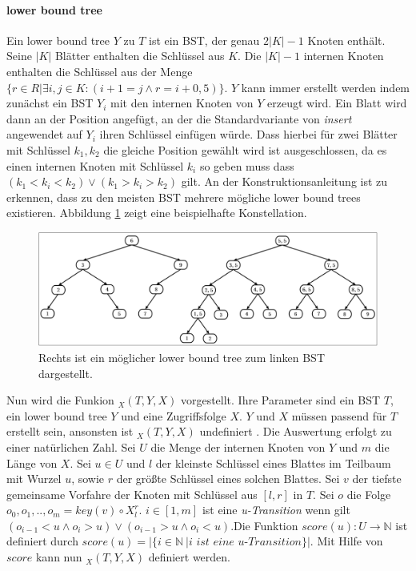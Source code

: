 \documentclass[a4paper,12pt]{article}
\begin{document}
\paragraph{lower bound tree} \label{wilberLowerBoundTree}
Ein lower bound tree $Y$ zu $T$ ist ein BST, der genau $2 \vert K\vert  - 1$ Knoten enthält. Seine $\vert K \vert$ Blätter enthalten die Schlüssel aus $K$. Die $\vert K \vert - 1$ internen Knoten enthalten die Schlüssel aus der Menge $\{r \in R \vert \exists i,j \in K \colon \left( i + 1 = j \land r = i + 0,5\right)\}$. $Y$ kann immer erstellt werden indem zunächst ein BST $Y_i$ mit den internen Knoten von $Y$ erzeugt wird. Ein Blatt wird dann an der Position angefügt, an der die Standardvariante von \textit{insert} angewendet auf $Y_i$ ihren Schlüssel einfügen würde. Dass hierbei für zwei Blätter mit Schlüssel $k_1, k_2$ die gleiche Position gewählt wird ist ausgeschlossen, da es einen internen Knoten mit Schlüssel $k_i$ so geben muss dass $\left(k_1 < k_i < k_2\right) \lor \left(k_1 > k_i > k_2 \right)$ gilt. An der Konstruktionsanleitung ist zu erkennen, dass zu den meisten BST mehrere mögliche lower bound trees existieren. Abbildung \ref{fig:lowerBoundTree} zeigt eine beispielhafte Konstellation. \\



\begin{figure}[h]
	\centering
	\includegraphics[width=1\textwidth]{"Medien/DynOpt/lowerBoundTree"}
	\caption{Rechts ist ein möglicher lower bound tree zum linken BST dargestellt.  }
	\label{fig:lowerBoundTree}
\end{figure}

\noindent Nun wird die Funkion $_X(T, Y, X) $ vorgestellt. Ihre Parameter sind ein BST $T$, ein lower bound tree $Y$ und eine Zugriffsfolge $X$. $Y$ und $X$ müssen passend für $T$ erstellt sein, ansonsten ist $_X(T, Y, X) $ undefiniert . Die Auswertung erfolgt zu einer natürlichen Zahl. Sei $U$ die Menge der internen Knoten von $Y$ und $m$ die Länge von $X$. Sei $u \in U$ und $l$ der kleinste Schlüssel eines Blattes im Teilbaum mit Wurzel $u$, sowie $r$ der größte Schlüssel eines solchen Blattes. Sei $v$ der tiefste gemeinsame Vorfahre der Knoten mit Schlüssel aus $\left[l, r\right]$  in $T$. Sei $o$ die Folge $o_0, o_1,..,o_m =  \mathit{key}(v) \circ X^r_l$. $i \in \left[1,m\right]$ ist eine \textit{u-Transition} wenn gilt $\left( o_{i-1} < u \land o_i > u \right) \lor \left( o_{i-1} > u \land o_i < u \right)$.Die Funktion $\mathit{score}\left(u\right) \colon U \rightarrow \mathbb{N}$ ist definiert durch $\mathit{score}\left(u\right) = \vert\{i \in \mathbb{N}\ \vert \textit{i ist eine u-Transition}\} \vert$. Mit Hilfe von $\mathit{score}$ kann nun  $_X(T, Y, X) $ definiert werden.
\end{document}
